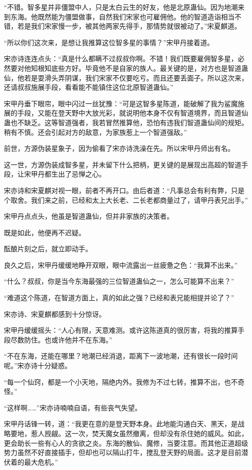 \begin{this_body}
“不错。智多星并非僵盟中人，只是太白云生的好友，他是北原蛊仙。因为地潮来到东海。他既然能为僵盟做事，自然我们宋家也可雇佣他。他的智道造诣相当不错，若是我们宋家慢一步，被其他两家先得手，那情势就很被动了。”宋夏麒道。

“所以你们这次来，是想让我推算这位智多星的事情？”宋甲丹接着道。

宋亦诗连连点头：“真是什么都瞒不过叔叔你啊。不错！我们既要雇佣智多星，必然要对他知根知底些方好。毕竟他不是自家的族人。最关键的是，对方也是智道蛊仙，他若是耍滑头弄阴谋，我们宋家不仅要吃亏。而且还要丢面子。所以这次来，还请叔叔施展手段，看看能不能镇住这位北原智道蛊仙。”

宋甲丹垂下眼帘，眼中闪过一丝犹豫：“可是这智多星陈道，能破解了我为鲨魔施展的手段，又能在登天野中大放光彩，就说明他本身不仅有智道境界，而且智道仙蛊也不缺乏。这等智道强者，我若冒然推算他，恐怕有违我们智道蛊仙间的规矩。稍有不慎。还会引起对方的敌意，为家族惹上一个智道强敌。”

前世，方源伪装星象子，因为偷看了宋亦诗洗澡在先。所以宋甲丹师出有名。

这一世，方源伪装成智多星，并未留下什么把柄，更关键的是展现出高超的智道手段，让宋甲丹都生出了忌惮之心。

宋亦诗和宋夏麒对视一眼，前者不再开口。由后者道：“凡事总会有利有弊，只是个取舍。我们来之前，已经和太上大长老、二长老都商量过了，请甲丹表兄出手。”

宋甲丹点点头，他虽是智道蛊仙，但并非家族的决策者。

既是如此，他便再不迟疑。

酝酿片刻之后，就立即动手。

良久之后，宋甲丹缓缓地睁开双眼，眼中流露出一丝疲惫之色：“我算不出来。”

“什么？叔叔，你是当今东海最强的三位智道蛊仙之一，怎么可能算不出来？”

“难道这个陈道，在智道方面上，真的如此之强？已经和表兄能相提并论了？”

宋亦诗、宋夏麒都感到十分惊讶。

宋甲丹缓缓摇头：“人心有限，天意难测。或许这陈道真的很厉害，将我的推算手段尽数防住。也或许他并不在东海。”

“不在东海，还能在哪里？地潮已经消退，距离下一波地潮，还有很长一段时间呢。”宋亦诗十分疑惑。

“每一个仙窍，都是一个小天地，隔绝内外。我修为不过七转，推算不出，也不奇怪。”

“这样啊……”宋亦诗喃喃自语，有些丧气失望。

宋甲丹话锋一转，道：“我更在意的是登天野本身。此地能沟通白天、黑天，是战略要地，惹人觊觎。这一次，焚天魔女虽然撤离，但却没有杀住她的威风。如此，更会助长一些有心人的贪欲之炎。东海的散仙、魔修，当要注意。而其他正道超级势力虽然不好直接插手，但却也可以隔山打牛，搅乱登天野的局面。这才是目前潜伏着的最大危机。”


\end{this_body}
